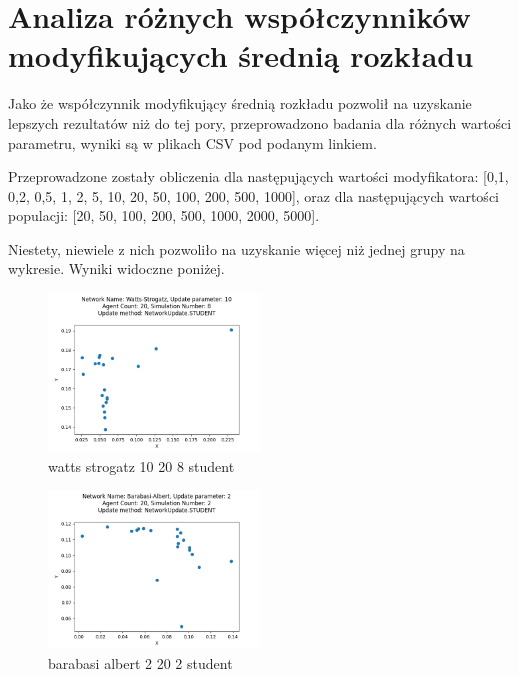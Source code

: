 \section{Analiza różnych współczynników modyfikujących średnią rozkładu}

Jako że współczynnik modyfikujący średnią rozkładu pozwolił na uzyskanie lepszych rezultatów niż do tej pory, przeprowadzono badania dla różnych wartości parametru, wyniki są w plikach CSV pod podanym linkiem.

Przeprowadzone zostały obliczenia dla następujących wartości modyfikatora: [0,1, 0,2, 0,5, 1, 2, 5, 10, 20, 50, 100, 200, 500, 1000],
oraz dla następujących wartości populacji: [20, 50, 100, 200, 500, 1000, 2000, 5000].

Niestety, niewiele z nich pozwoliło na uzyskanie więcej niż jednej grupy na wykresie. Wyniki widoczne poniżej.

\begin{figure}
    \centering
    \includegraphics[width=0.5\textwidth]{img/watts_strogatz_10_20_8_student.png}
    \caption{watts strogatz 10 20 8 student}
    \label{fig:watts_strogatz_10_20_8_student}
\end{figure}

\begin{figure}
    \centering
    \includegraphics[width=0.5\textwidth]{img/barabasi_albert_2_20_2_student.png}
    \caption{barabasi albert 2 20 2 student}
    \label{fig:barabasi_albert_2_20_2_student}
\end{figure}

